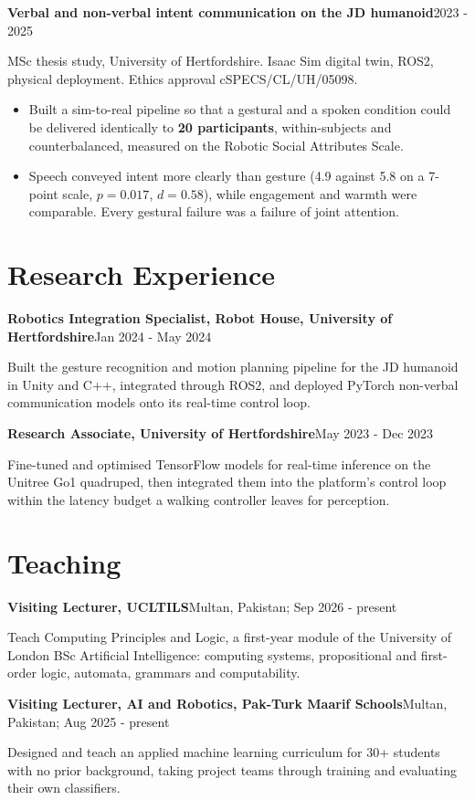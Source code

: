 \documentclass[10pt]{article}
\newcommand{\entry}[2]{{\textbf{#1}\hfill {\small #2}\par}}
\newcommand{\sub}[1]{{\small\color{dim}#1\par}}
\newcommand{\gap}{\vspace{4pt}}
\begin{document}
\gap
\entry{Verbal and non-verbal intent communication on the JD humanoid}{2023 - 2025}
\sub{MSc thesis study, University of Hertfordshire. Isaac Sim digital twin, ROS2, physical deployment. Ethics approval cSPECS/CL/UH/05098.}
\begin{itemize}
\item Built a sim-to-real pipeline so that a gestural and a spoken condition could be delivered identically to
\textbf{20 participants}, within-subjects and counterbalanced, measured on the Robotic Social Attributes Scale.
\item Speech conveyed intent more clearly than gesture (4.9 against 5.8 on a 7-point scale, $p=0.017$, $d=0.58$), while
engagement and warmth were comparable. Every gestural failure was a failure of joint attention.
\end{itemize}

\newpage
\section{Research Experience}
\entry{Robotics Integration Specialist, Robot House, University of Hertfordshire}{Jan 2024 - May 2024}
\sub{Built the gesture recognition and motion planning pipeline for the JD humanoid in Unity and C++, integrated through
ROS2, and deployed PyTorch non-verbal communication models onto its real-time control loop.}
\gap
\entry{Research Associate, University of Hertfordshire}{May 2023 - Dec 2023}
\sub{Fine-tuned and optimised TensorFlow models for real-time inference on the Unitree Go1 quadruped, then integrated them
into the platform's control loop within the latency budget a walking controller leaves for perception.}

\section{Teaching}
\entry{Visiting Lecturer, UCLTILS}{Multan, Pakistan; Sep 2026 - present}
\sub{Teach Computing Principles and Logic, a first-year module of the University of London BSc Artificial Intelligence:
computing systems, propositional and first-order logic, automata, grammars and computability.}
\gap
\entry{Visiting Lecturer, AI and Robotics, Pak-Turk Maarif Schools}{Multan, Pakistan; Aug 2025 - present}
\sub{Designed and teach an applied machine learning curriculum for 30+ students with no prior background, taking project
teams through training and evaluating their own classifiers.}
\end{document}
